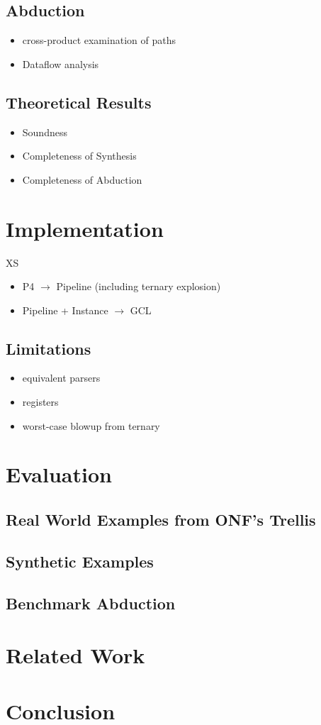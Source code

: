\subsection{Abduction}
\begin{itemize}
\item cross-product examination of paths
\item Dataflow analysis
\end{itemize}

\subsection{Theoretical Results}
\begin{itemize}
\item Soundness
\item Completeness of Synthesis
\item Completeness of Abduction
\end{itemize}

\section{Implementation}
XS
\begin{itemize}
\item P4 $\to$ Pipeline (including ternary explosion)
\item Pipeline + Instance $\to$  GCL
\end{itemize}

\subsection{Limitations}
\begin{itemize}
\item equivalent parsers
\item registers
\item worst-case blowup from ternary
\end{itemize}

\section{Evaluation}
\subsection{Real World Examples from ONF's Trellis}
\subsection{Synthetic Examples}
\subsection{Benchmark Abduction}

\section{Related Work}
 

\section{Conclusion}

